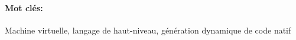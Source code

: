 \documentclass[a4paper,11pt,twoside]{include/ThesisStyle}
\begin{document}
\paragraph{Mot clés:} Machine virtuelle, langage de haut-niveau, génération dynamique de code natif
 
\renewcommand{\baselinestretch}{1}\normalsize

\renewcommand{\baselinestretch}{1.2}\normalsize
\mainmatter
{}



%







\appendix
%





\thispagestyle{empty}
\end{document}
